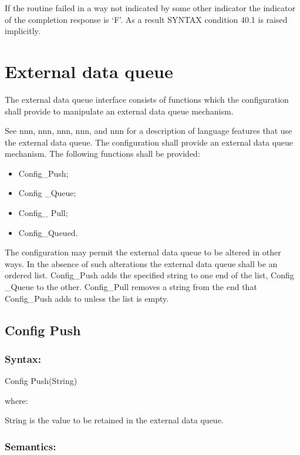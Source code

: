 If the routine failed in a way not indicated by some other indicator the
indicator of the completion response is `F'. As a result SYNTAX
condition 40.1 is raised implicitly.

\section{External data queue}\label{external-data-queue}

The external data queue interface consists of functions which the
configuration shall provide to manipulate an external data queue
mechanism.

See nnn, nnn, nnn, nnn, and nnn for a description of language features
that use the external data queue. The configuration shall provide an
external data queue mechanism. The following functions shall be
provided:

\begin{itemize}
\item
  Config\_Push;
\item
  Config \_Queue;
\item
  Config\_ Pull;
\item
  Config\_Queued.
\end{itemize}

The configuration may permit the external data queue to be altered in
other ways. In the absence of such alterations the external data queue
shall be an ordered list. Config\_Push adds the specified string to one
end of the list, Config \_Queue to the other. Config\_Pull removes a
string from the end that Config\_Push adds to unless the list is empty.

\subsection{Config Push}\label{config-push}

\subsubsection{Syntax:}\label{syntax-19}

Config Push(String)

where:

String is the value to be retained in the external data queue.

\subsubsection{Semantics:}\label{semantics-20}

